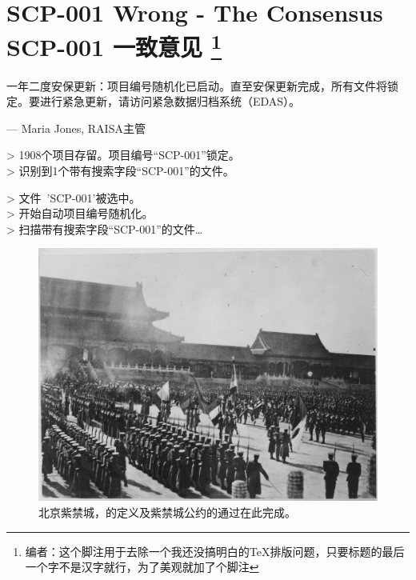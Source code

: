 \chapter[SCP-001 一致意见]{
	SCP-001 Wrong - The Consensus \\
	SCP-001 一致意见
	\footnote{编者\QIS：这个脚注用于去除一个我还没搞明白的\TeX 排版问题，只要标题的最后一个字不是汉字就行，为了美观就加了个脚注\label{foot:fix}}
}

\label{chap:SCP-001.the.consensus}


\begin{scpbox}[colback=ftwoftwoctwo, center upper]


一年二度安保更新：项目编号随机化已启动。直至安保更新完成，所有文件将锁定。要进行紧急更新，请访问紧急数据归档系统（EDAS）。

— Maria Jones, RAISA主管

\end{scpbox}

\hr

\begin{scpboxcmd}

> 1908个项目存留。项目编号“SCP-001”锁定。 \\
> 识别到1个带有搜索字段“SCP-001”的文件。

> 文件~'SCP-001'被选中。 \\
> 开始自动项目编号随机化。 \\
> 扫描带有搜索字段“SCP-001”的文件…

\end{scpboxcmd}

\hr

\begin{figure}[H]
	\centering
	\includegraphics{images/SCP.001.the.consensus.jpg}
	\caption*{北京紫禁城，的定义及紫禁城公约的通过在此完成。}
\end{figure}

